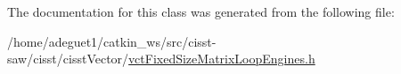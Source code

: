 The documentation for this class was generated from the following file\-:\begin{DoxyCompactItemize}
\item 
/home/adeguet1/catkin\-\_\-ws/src/cisst-\/saw/cisst/cisst\-Vector/\hyperlink{vct_fixed_size_matrix_loop_engines_8h}{vct\-Fixed\-Size\-Matrix\-Loop\-Engines.\-h}\end{DoxyCompactItemize}
